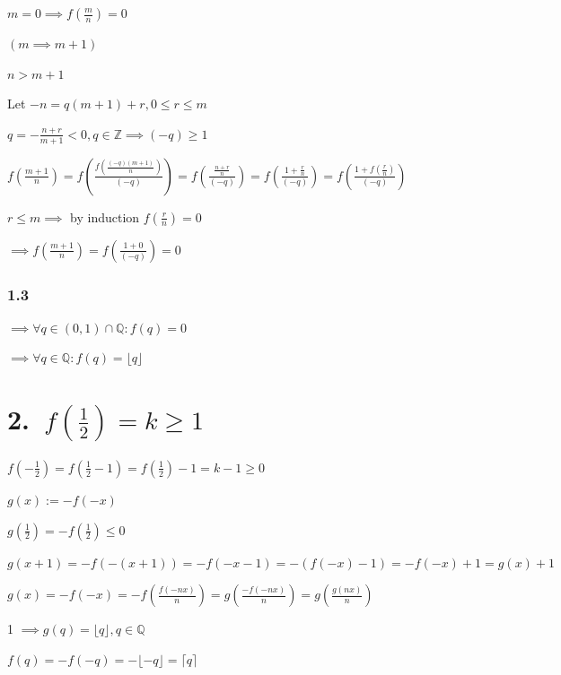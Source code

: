 \documentclass{article}
\begin{document}
\( m = 0 \implies f(\frac{m}{n}) = 0 \)

\( (m \implies m + 1) \)

\( n > m + 1 \)

Let \( -n = q(m+1) + r, 0 \leq r \leq m \)

\( q = -\frac{n+r}{m+1} < 0, q \in \mathbb{Z} \implies (-q) \geq 1 \)

\( f(\frac{m+1}{n}) = f(\frac{f(\frac{(-q)(m+1)}{n})}{(-q)}) = f(\frac{\frac{n+r}{n}}{(-q)}) = f(\frac{1+ \frac{r}{n}}{(-q)}) = f(\frac{1+f(\frac{r}{n})}{(-q)}) \)

\( r \leq m \implies \) by induction \( f(\frac{r}{n}) =0 \)

\( \implies f(\frac{m+1}{n}) = f(\frac{1+0}{(-q)}) = 0 \)

\subsubsection*{1.3}

\( \implies \forall q \in (0,1) \cap \mathbb{Q}: f(q) = 0 \)

\( \implies \forall q \in \mathbb{Q}: f(q) = \lfloor{q}\rfloor \)

\section*{2.\ \( f(\frac{1}{2}) = k \geq 1 \)}

\( f(-\frac{1}{2}) = f(\frac{1}{2}-1)=f(\frac{1}{2})-1= k-1 \geq 0 \)

\( g(x) := -f(-x) \)

\( g(\frac{1}{2}) = -f(\frac{1}{2}) \leq 0 \)

\( g(x+1) = -f(-(x+1)) = -f(-x-1) = -(f(-x) - 1) = -f(-x) + 1 = g(x) + 1 \)

\( g(x) = -f(-x) = -f(\frac{f(-nx)}{n}) = g(\frac{-f(-nx)}{n}) = g(\frac{g(nx)}{n}) \)

1 \( \implies g(q) = \lfloor{q}\rfloor, q \in \mathbb{Q} \)

\( f(q) = -f(-q) = -\lfloor{-q}\rfloor = \lceil{q}\rceil \)
\end{document}

